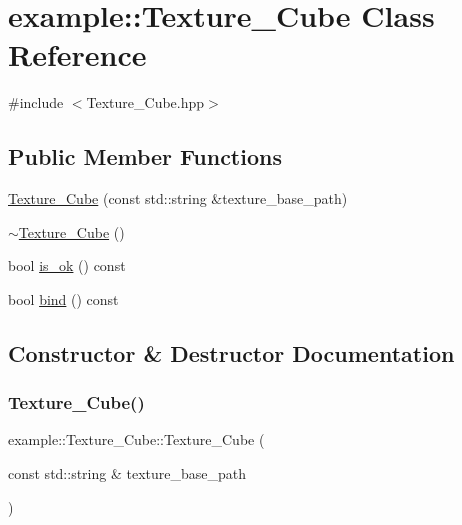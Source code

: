 \hypertarget{classexample_1_1_texture___cube}{}\section{example\+:\+:Texture\+\_\+\+Cube Class Reference}
\label{classexample_1_1_texture___cube}


{\ttfamily \#include $<$Texture\+\_\+\+Cube.\+hpp$>$}

\subsection*{Public Member Functions}
\begin{DoxyCompactItemize}
\item 
\mbox{\hyperlink{classexample_1_1_texture___cube_a3661927d4b4b5f7877b699fed5f6122a}{Texture\+\_\+\+Cube}} (const std\+::string \&texture\+\_\+base\+\_\+path)
\item 
\mbox{\hyperlink{classexample_1_1_texture___cube_a3d6c6153b1384fe211b27942490483c1}{$\sim$\+Texture\+\_\+\+Cube}} ()
\item 
bool \mbox{\hyperlink{classexample_1_1_texture___cube_a0b38a05575c874f9388809b5c044bcdc}{is\+\_\+ok}} () const
\item 
bool \mbox{\hyperlink{classexample_1_1_texture___cube_af2ead8631bcd59d2bbce051e2f495bdf}{bind}} () const
\end{DoxyCompactItemize}


\subsection{Constructor \& Destructor Documentation}
\mbox{\label{classexample_1_1_texture___cube_a3661927d4b4b5f7877b699fed5f6122a}} 
\subsubsection{\texorpdfstring{Texture\+\_\+\+Cube()}{Texture\_Cube()}}
{\footnotesize\ttfamily example\+::\+Texture\+\_\+\+Cube\+::\+Texture\+\_\+\+Cube (\begin{DoxyParamCaption}\item[{const std\+::string \&}]{texture\+\_\+base\+\_\+path }\end{DoxyParamCaption})}

